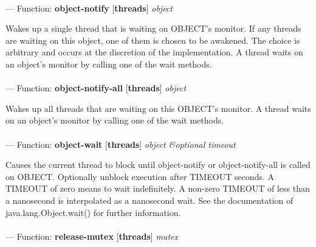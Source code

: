 \paragraph{}
\label{THREADS:OBJECT-NOTIFY}
--- Function: \textbf{object-notify} [\textbf{threads}] \textit{object}

\begin{adjustwidth}{5em}{5em}
Wakes up a single thread that is waiting on OBJECT's monitor.
If any threads are waiting on this object, one of them is chosen to be awakened. The choice is arbitrary and occurs at the discretion of the implementation. A thread waits on an object's monitor by calling one of the wait methods.
\end{adjustwidth}

\paragraph{}
\label{THREADS:OBJECT-NOTIFY-ALL}
--- Function: \textbf{object-notify-all} [\textbf{threads}] \textit{object}

\begin{adjustwidth}{5em}{5em}
Wakes up all threads that are waiting on this OBJECT's monitor.
A thread waits on an object's monitor by calling one of the wait methods.
\end{adjustwidth}

\paragraph{}
\label{THREADS:OBJECT-WAIT}
--- Function: \textbf{object-wait} [\textbf{threads}] \textit{object \&optional timeout}

\begin{adjustwidth}{5em}{5em}
Causes the current thread to block until object-notify or object-notify-all is called on OBJECT.
Optionally unblock execution after TIMEOUT seconds.  A TIMEOUT of zero
means to wait indefinitely.
A non-zero TIMEOUT of less than a nanosecond is interpolated as a nanosecond wait.
See the documentation of java.lang.Object.wait() for further
information.

\end{adjustwidth}

\paragraph{}
\label{THREADS:RELEASE-MUTEX}
--- Function: \textbf{release-mutex} [\textbf{threads}] \textit{mutex}

